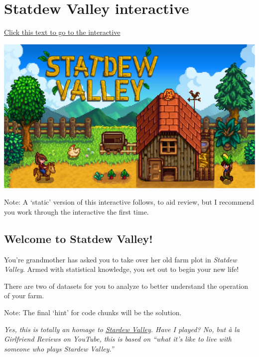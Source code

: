 \documentclass[
  openany]{book}
\begin{document}
\hypertarget{statdew-valley-interactive}{%
\section{Statdew Valley interactive}\label{statdew-valley-interactive}}

\href{https://jupyter.utoronto.ca/hub/user-redirect/git-pull?repo=https\%3A\%2F\%2Fgithub.com\%2Fsta303-bolton\%2Fsta303-w22-activities\&urlpath=shiny\%2Fsta303-w22-activities\%2Finst\%2Ftutorials\%2Fsta303_m3_statdew\%2Fsta303_m3_statdew-valley.Rmd\&branch=master}{Click this text to go to the interactive}

\begin{center}\includegraphics[width=1\linewidth]{images/m3/statdewvalley} \end{center}

Note: A `static' version of this interactive follows, to aid review, but I recommend you work through the interactive the first time.

\hypertarget{welcome-to-statdew-valley}{%
\subsection{Welcome to Statdew Valley!}\label{welcome-to-statdew-valley}}

You're grandmother has asked you to take over her old farm plot in \emph{Statdew Valley}. Armed with statistical knowledge, you set out to begin your new life!

There are two of datasets for you to analyze to better understand the operation of your farm.

Note: The final `hint' for code chunks will be the solution.

\emph{Yes, this is totally an homage to \href{https://www.stardewvalley.net/}{Stardew Valley}. Have I played? No, but à la Girlfriend Reviews on YouTube, this is based on ``what it's like to live with someone who plays Stardew Valley.''}
\end{document}
